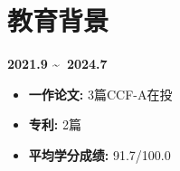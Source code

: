 \documentclass[UTF8,AutoFakeBold]{resume}
\begin{document}
\section{\hspace{0.25em}\makebox[0.75em][c]{\faGraduationCap} \fangsong\textbf{教育背景}}
{\quad \textbf{2021.9 \textasciitilde \ 2024.7}}
    \begin{minipage}[t]{0.40\textwidth}
    	\begin{itemize}
    		\item \kaishu\textbf{一作论文: }3篇CCF-A在投
    	\end{itemize}
    \end{minipage}
    \begin{minipage}[t]{0.20\textwidth}
    	\begin{itemize}
    		\item \kaishu\textbf{专利: }2篇
    	\end{itemize}
    \end{minipage}
    \begin{minipage}[t]{0.40\textwidth}
    	\begin{itemize}
    		\item \kaishu\textbf{平均学分成绩: }91.7/100.0
    	\end{itemize}
    \end{minipage}
\end{document}
